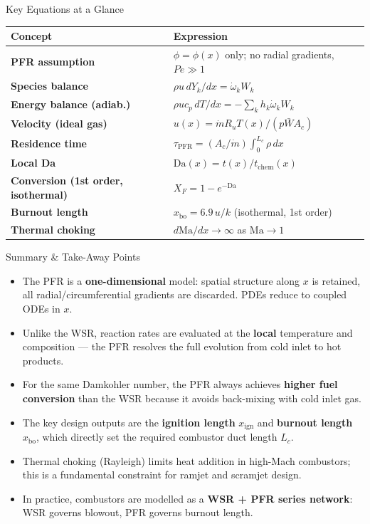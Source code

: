 \documentclass[12pt,aspectratio=169]{beamer}
\newcommand{\tchem}{t_{\text{chem}}}
\newcommand{\Da}{\mathrm{Da}}
\newcommand{\mdot}{\dot{m}}
\newcommand{\Ma}{\mathrm{Ma}}
\newcommand{\Ac}{A_c}
\newcommand{\taupfr}{\tau_{\text{PFR}}}
\newcommand{\wdot}{\dot{\omega}}
\begin{document}
\begin{frame}{Key Equations at a Glance}
  \renewcommand{\arraystretch}{1.6}
  \begin{tabular}{>{\bfseries}p{4.0cm} p{7.4cm}}
    \toprule
    Concept & Expression \\
    \midrule
    PFR assumption & $\phi = \phi(x)$ only; no radial gradients,
                      $Pe \gg 1$ \\
    Species balance & $\rho u\,dY_k/dx = \wdot_k W_k$ \\
    Energy balance (adiab.) & $\rho u c_p\,dT/dx = -\sum_k h_k\wdot_k W_k$ \\
    Velocity (ideal gas) & $u(x) = \mdot R_u T(x)/(p\bar{W}\Ac)$ \\
    Residence time & $\taupfr = (\Ac/\mdot)\int_0^{L_c}\rho\,dx$ \\
    Local Da & $\Da(x) = t(x)/\tchem(x)$ \\
    Conversion (1st order, isothermal) & $X_F = 1 - e^{-\Da}$ \\
    Burnout length & $x_{\text{bo}} = 6.9\,u/k$ (isothermal, 1st order) \\
    Thermal choking & $d\Ma/dx \to \infty$ as $\Ma \to 1$ \\
    \bottomrule
  \end{tabular}
\end{frame}

\begin{frame}{Summary \& Take-Away Points}
  \begin{itemize}
    \item The PFR is a \textbf{one-dimensional} model: spatial
          structure along $x$ is retained, all radial/circumferential
          gradients are discarded. PDEs reduce to coupled ODEs in $x$.
    \item Unlike the WSR, reaction rates are evaluated at the
          \textbf{local} temperature and composition --- the PFR
          resolves the full evolution from cold inlet to hot products.
    \item For the same Damkohler number, the PFR always achieves
          \textbf{higher fuel conversion} than the WSR because it
          avoids back-mixing with cold inlet gas.
    \item The key design outputs are the \textbf{ignition length}
          $x_{\text{ign}}$ and \textbf{burnout length} $x_{\text{bo}}$,
          which directly set the required combustor duct length $L_c$.
    \item \alert{Thermal choking} (Rayleigh) limits heat addition in
          high-Mach combustors; this is a fundamental constraint for
          ramjet and scramjet design.
    \item In practice, combustors are modelled as a
          \textbf{WSR + PFR series network}: WSR governs blowout,
          PFR governs burnout length.
  \end{itemize}
  \vfill
\end{frame}
\end{document}
